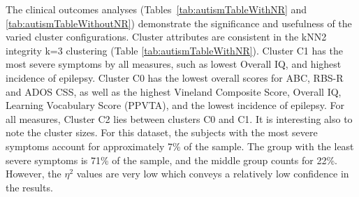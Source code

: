 \documentclass{bmcart}
\begin{document}

The clinical outcomes analyses (Tables~\ref{tab:autismTableWithNR} and~%
\ref{tab:autismTableWithoutNR}) demonstrate the significance and usefulness of the varied cluster configurations.  
Cluster attributes are consistent in the kNN2 integrity k=3 clustering (Table \ref{tab:autismTableWithNR}). Cluster C1 has the most severe symptoms by all measures, such as lowest Overall IQ, and highest incidence of epilepsy.  Cluster C0 has the lowest overall scores for ABC, RBS-R and ADOS CSS, as well as the highest Vineland Composite Score, Overall IQ, Learning Vocabulary Score (PPVTA), and the lowest incidence of epilepsy.  For all measures, Cluster C2 lies between clusters C0 and C1.  It is interesting also to note the cluster sizes.  For this dataset, the subjects with the most severe symptoms account for approximately 7\% of the sample. The group with the least severe symptoms is 71\% of the sample, and the middle group counts for 22\%. However, the $\eta^2$ values are very low which conveys a relatively low confidence in the results. 
\end{document}
